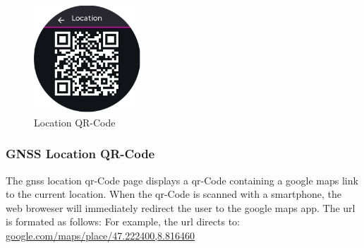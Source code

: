 \begin{minipage}{\linewidth}
	\begin{figure}
		\vspace{-0.6cm}
		\includegraphics[width=4cm]{images/6_design_final/gui/07_gnss_location.png}
		\centering
		\caption{Location QR-Code}
		\label{fig:final_design_gui_gnss_location}
	\end{figure}
	\subsubsection{GNSS Location QR-Code}
	The \acrshort{gnss} location \acrshort{qr}-Code page displays a \acrshort{qr}-Code containing a google maps link to the current location.
	When the \acrshort{qr}-Code is scanned with a smartphone, the web broweser will immediately redirect the user to the google maps app.
	The \acrshort{url} is formated as follows: \smallskip \newline
	 \smallskip \newline
	For example, the \acrshort{url} directs to: \smallskip \newline
	\url{google.com/maps/place/47.222400,8.816460}
\end{minipage}
\vspace{-0.2cm}

